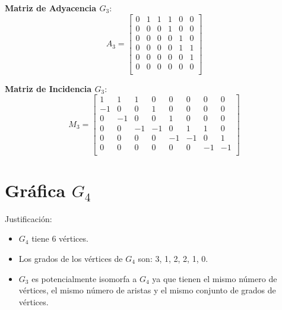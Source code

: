 \documentclass{article}
\begin{document}
\textbf{Matriz de Adyacencia \( G_3 \)}:
\[
	A_3 =
	\begin{bmatrix}
		0 & 1 & 1 & 1 & 0 & 0 \\
		0 & 0 & 0 & 1 & 0 & 0 \\
		0 & 0 & 0 & 0 & 1 & 0 \\
		0 & 0 & 0 & 0 & 1 & 1 \\
		0 & 0 & 0 & 0 & 0 & 1 \\
		0 & 0 & 0 & 0 & 0 & 0 \\
	\end{bmatrix}
\]


\textbf{Matriz de Incidencia \( G_3 \)}:
\[
	M_3 =
	\begin{bmatrix}
		1  & 1  & 1  & 0  & 0  & 0  & 0  & 0  \\
		-1 & 0  & 0  & 1  & 0  & 0  & 0  & 0  \\
		0  & -1 & 0  & 0  & 1  & 0  & 0  & 0  \\
		0  & 0  & -1 & -1 & 0  & 1  & 1  & 0  \\
		0  & 0  & 0  & 0  & -1 & -1 & 0  & 1  \\
		0  & 0  & 0  & 0  & 0  & 0  & -1 & -1 \\
	\end{bmatrix}
\]



\section*{Gráfica \( G_4 \)}

\begin{center}
\end{center}

Justificación:
\begin{itemize}
    \item \( G_4 \) tiene 6 vértices.
    \item Los grados de los vértices de \( G_4 \) son: 3, 1, 2, 2, 1, 0.
    \item \( G_3 \) es potencialmente isomorfa a \( G_4 \) ya que tienen el mismo número de vértices, el mismo número de aristas y el mismo conjunto de grados de vértices. 
\end{itemize}
\end{document}
